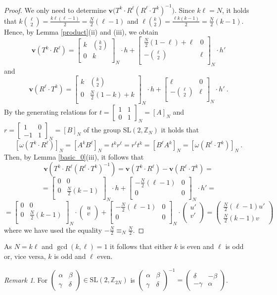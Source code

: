 \documentclass[10pt]{amsart}
\theoremstyle{plain}
\theoremstyle{definition}
\theoremstyle{remark}%
\newtheorem{remark}[theorem]{Remark}
\newcommand{\Z}{\mathbb{Z}}
\newcommand{\f}{\mathbf{v}}
\newcommand{\g}{\omega}
\newcommand{\SL}{\mathrm{SL}}
\newcommand{\matN}[4]{\left[\begin{array}{cc}
 #1 & #2\\
 #3 & #4\\
\end{array}\right]_N}
\newcommand{\vc}[2]{\left(\begin{array}{c}
 #1 \\
 #2\\
\end{array}\right)}
\begin{document}
\begin{proof}
We only need to determine $\f\big(T^k\cdot R^\ell\left(R^\ell\cdot T^k\right)^{-1}\big)$.
Since $k\ell=N$, it holds that $k{\ell\choose 2}=\frac{k\ell(\ell-1)}{2}=\frac{N}{2}(\ell-1)$ and $\ell{k\choose 2}=\frac{\ell k(k-1)}{2}=\frac{N}{2}(k-1)$. Hence, by Lemma \ref{product}(ii) and (iii), we obtain 
$$\f(T^k\cdot R^\ell)=\matN{k}{{k\choose 2}}{0}{k}\cdot h+\matN{\frac{N}{2}(1-\ell)+\ell}{0}{-{\ell\choose 2}}{\ell}\cdot h'$$ and
$$\f(R^\ell\cdot T^k)=\matN{k}{{k\choose 2}}{0}{\frac{N}{2}(1-k)+k}\cdot h+\matN{\ell}{0}{-{\ell\choose 2}}{\ell}\cdot h'\ .$$
By the generating relations for 
$t=\left[\begin{smallmatrix}1 & 1\\ 0 & 1\end{smallmatrix}\right]_{N}=[A]_N$ and $r=\left[\begin{smallmatrix}1 & 0\\ -1 & 1\end{smallmatrix}\right]_{N}=[B]_N$ of the group $\SL(2,\Z_{N})$ it holds that  $$\left[\g(T^k\cdot R^\ell)\right]_{N}=\left[A^kB^\ell\right]_N=t^kr^{\ell}=r^{\ell}t^k=\left[B^\ell A^k\right]_N=\left[\g(R^\ell\cdot T^k)\right]_{N}\ .$$  Then, by Lemma  \ref{basic_0}(iii), it follows that
 $$\f\left(T^k\cdot R^\ell\left(R^\ell\cdot T^k\right)^{-1}\right)=\f\left(T^k\cdot R^\ell\right)-\f\left(R^\ell\cdot T^k\right)=$$
 $$=\matN{0}{0}{0}{\frac{N}{2}(k-1)}\cdot h+\matN{-\frac{N}{2}(\ell-1)}{0}{0}{0}\cdot h'=$$
 $$=\matN{0}{0}{0}{\frac{N}{2}(k-1)}\cdot \vc{u}{v}+\matN{-\frac{N}{2}(\ell-1)}{0}{0}{0}\cdot \vc{u'}{v'}=\left(\begin{array}{c}\frac{N}{2}(\ell-1)u'\\[2mm]\frac{N}{2}(k-1)v\end{array}\right)$$
where we have used the equality $-\frac{N}{2}\equiv_{N}\frac{N}{2}$.
\end{proof}



As $N=k\ell$ and $\gcd(k,\ell)=1$ it follows that either $k$ is even and $\ell$ is odd or, vice versa, $k$ is odd and $\ell$ even.

\begin{remark}\label{inverse}
 For $\left(\begin{smallmatrix}\alpha & \beta\\ \gamma & \delta\end{smallmatrix}\right)\in\SL(2,\Z_{2N})$ is $\left(\begin{smallmatrix}\alpha & \beta\\ \gamma & \delta\end{smallmatrix}\right)^{-1}=\left(\begin{smallmatrix}\delta & -\beta\\ -\gamma & \alpha\end{smallmatrix}\right)$.
\end{remark}
\end{document}
